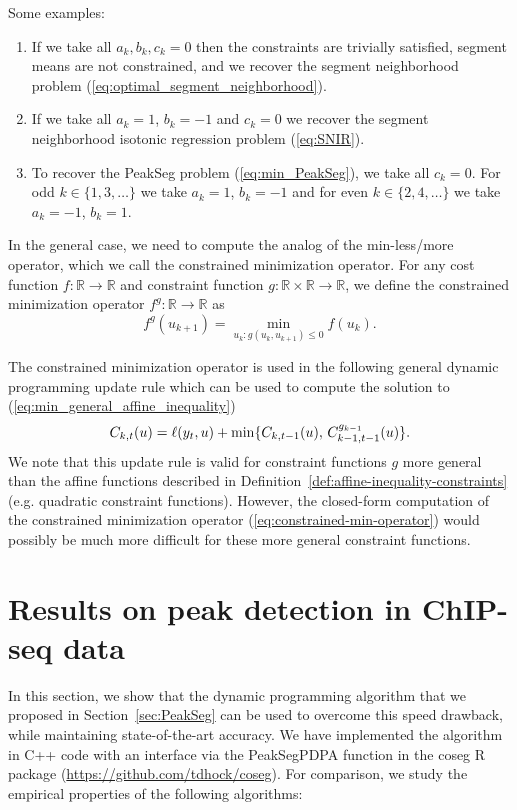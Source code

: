 \documentclass{article}
\newcommand{\RR}{\mathbb R}
\begin{document}
Some examples:
\begin{enumerate}
\item If we take all $a_k,b_k,c_k=0$ then the constraints are
  trivially satisfied, segment means are not constrained, and we
  recover the segment neighborhood problem
  (\ref{eq:optimal_segment_neighborhood}).
\item If we take all $a_{k} =1$, $b_{k}=-1$ and $c_{k} = 0$ we
  recover the segment neighborhood isotonic regression problem (\ref{eq:SNIR}).
\item To recover the PeakSeg problem (\ref{eq:min_PeakSeg}),
  we take all $c_{k} = 0$. For odd $k\in\{1,3,\dots\}$ we take
  $a_{k} =1$, $b_{k}=-1$ and for even $k\in\{2,4,\dots\}$ we take
  $a_{k} =-1$, $b_{k}=1$.
\end{enumerate}

In the general case, we need to compute the analog of the
min-less/more operator, which we call the constrained minimization
operator. For any cost function $f:\RR\rightarrow\RR$ and constraint
function $g:\RR\times\RR\rightarrow\RR$, we define the constrained
minimization operator $f^g:\RR\rightarrow\RR$ as
\begin{equation}
  \label{eq:constrained-min-operator}
  f^g(u_{k+1}) = \min_{u_k : g(u_k, u_{k+1})\leq 0} f(u_k).
\end{equation}

The constrained minimization operator is used in the following general
dynamic programming update rule which can be used to compute the solution to (\ref{eq:min_general_affine_inequality})
\begin{equation}
  \label{eq:general_dp}
  C_{k,t}(u) = \ell(y_t,u) + \min\{
  C_{k,t-1}(u),\,
  C_{k-1,t-1}^{g_{k-1}}(u)
  \}.
\end{equation}
We note that this update rule is valid for constraint functions $g$
more general than the affine functions described in
Definition~\ref{def:affine-inequality-constraints} (e.g. quadratic
constraint functions). However, the closed-form computation of the
constrained minimization operator (\ref{eq:constrained-min-operator})
would possibly be much more difficult for these more general constraint functions. 

\section{Results on peak detection in ChIP-seq data}
\label{sec:results-chip-seq}

In this section, we show that the dynamic programming algorithm that
we proposed in Section~\ref{sec:PeakSeg} can be used to overcome this
speed drawback, while maintaining state-of-the-art accuracy. We have
implemented the algorithm in C++ code with an interface via the
PeakSegPDPA function in the coseg R package
(\url{https://github.com/tdhock/coseg}). For comparison, we study the
empirical properties of the following algorithms:
\end{document}
